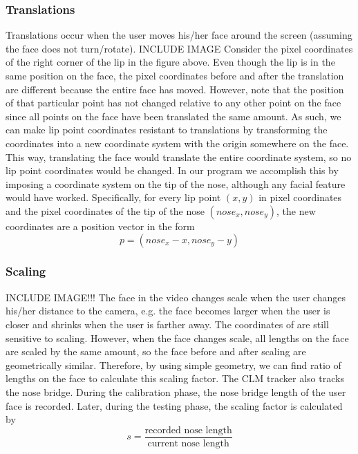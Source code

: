 \documentclass[10pt,twocolumn,letterpaper]{article}
\begin{document}
\subsubsection{Translations}
Translations occur when the user moves his/her face around the screen (assuming the face does not turn/rotate).
INCLUDE IMAGE
Consider the pixel coordinates of the right corner of the lip in the figure above. Even though the lip is in the same position on the face, the pixel coordinates before and after the translation are different because the entire face has moved. However, note that the position of that particular point has not changed relative to any other point on the face since all points on the face have been translated the same amount. As such, we can make lip point coordinates resistant to translations by transforming the coordinates into a new coordinate system with the origin somewhere on the face. This way, translating the face would translate the entire coordinate system, so no lip point coordinates would be changed.
In our program we accomplish this by imposing a coordinate system on the tip of the nose, although any facial feature would have worked. Specifically, for every lip point $(x, y)$ in pixel coordinates and the pixel coordinates of the tip of the nose $(nose_x, nose_y)$, the new coordinates are a position vector in the form
\begin{equation}
  p = (nose_x - x, nose_y - y)
\end{equation}
\subsubsection{Scaling}
INCLUDE IMAGE!!!
The face in the video changes scale when the user changes his/her distance to the camera, e.g. the face becomes larger when the user is closer and shrinks when the user is farther away. The coordinates of  are still sensitive to scaling. However, when the face changes scale, all lengths on the face are scaled by the same amount, so the face before and after scaling are geometrically similar. Therefore, by using simple geometry, we can find ratio of lengths on the face to calculate this scaling factor.
The CLM tracker also tracks the nose bridge. During the calibration phase, the nose bridge length of the user face is recorded. Later, during the testing phase, the scaling factor is calculated by
\begin{equation}
  s = \frac{\textrm{recorded nose length}}{\textrm{current nose length}}
\end{equation}
\end{document}
